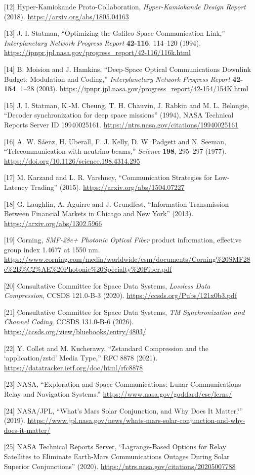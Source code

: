 \documentclass[
]{article}
\begin{document}
{[}12{]} Hyper-Kamiokande Proto-Collaboration, \emph{Hyper-Kamiokande
Design Report} (2018). \url{https://arxiv.org/abs/1805.04163}

{[}13{]} J. I. Statman, ``Optimizing the Galileo Space Communication
Link,'' \emph{Interplanetary Network Progress Report} \textbf{42-116},
114--120 (1994).
\url{https://ipnpr.jpl.nasa.gov/progress_report/42-116/116k.html}

{[}14{]} B. Moision and J. Hamkins, ``Deep-Space Optical Communications
Downlink Budget: Modulation and Coding,'' \emph{Interplanetary Network
Progress Report} \textbf{42-154}, 1--28 (2003).
\url{https://ipnpr.jpl.nasa.gov/progress_report/42-154/154K.html}

{[}15{]} J. I. Statman, K.-M. Cheung, T. H. Chauvin, J. Rabkin and M. L.
Belongie, ``Decoder synchronization for deep space missions'' (1994),
NASA Technical Reports Server ID 19940025161.
\url{https://ntrs.nasa.gov/citations/19940025161}

{[}16{]} A. W. Sáenz, H. Uberall, F. J. Kelly, D. W. Padgett and N.
Seeman, ``Telecommunication with neutrino beams,'' \emph{Science}
\textbf{198}, 295--297 (1977).
\url{https://doi.org/10.1126/science.198.4314.295}

{[}17{]} M. Karzand and L. R. Varshney, ``Communication Strategies for
Low-Latency Trading'' (2015). \url{https://arxiv.org/abs/1504.07227}

{[}18{]} G. Laughlin, A. Aguirre and J. Grundfest, ``Information
Transmission Between Financial Markets in Chicago and New York'' (2013).
\url{https://arxiv.org/abs/1302.5966}

{[}19{]} Corning, \emph{SMF-28e+ Photonic Optical Fiber} product
information, effective group index 1.4677 at 1550 nm.
\url{https://www.corning.com/media/worldwide/csm/documents/Corning\%20SMF28e\%2B\%C2\%AE\%20Photonic\%20Specialty\%20Fiber.pdf}

{[}20{]} Consultative Committee for Space Data Systems, \emph{Lossless
Data Compression}, CCSDS 121.0-B-3 (2020).
\url{https://ccsds.org/Pubs/121x0b3.pdf}

{[}21{]} Consultative Committee for Space Data Systems, \emph{TM
Synchronization and Channel Coding}, CCSDS 131.0-B-6 (2026).
\url{https://ccsds.org/view/bluebooks/entry/4803/}

{[}22{]} Y. Collet and M. Kucherawy, ``Zstandard Compression and the
`application/zstd' Media Type,'' RFC 8878 (2021).
\url{https://datatracker.ietf.org/doc/html/rfc8878}

{[}23{]} NASA, ``Exploration and Space Communications: Lunar
Communications Relay and Navigation Systems.''
\url{https://www.nasa.gov/goddard/esc/lcrns/}

{[}24{]} NASA/JPL, ``What's Mars Solar Conjunction, and Why Does It
Matter?'' (2019).
\url{https://www.jpl.nasa.gov/news/whats-mars-solar-conjunction-and-why-does-it-matter/}

{[}25{]} NASA Technical Reports Server, ``Lagrange-Based Options for
Relay Satellites to Eliminate Earth-Mars Communications Outages During
Solar Superior Conjunctions'' (2020).
\url{https://ntrs.nasa.gov/citations/20205007788}
\end{document}
